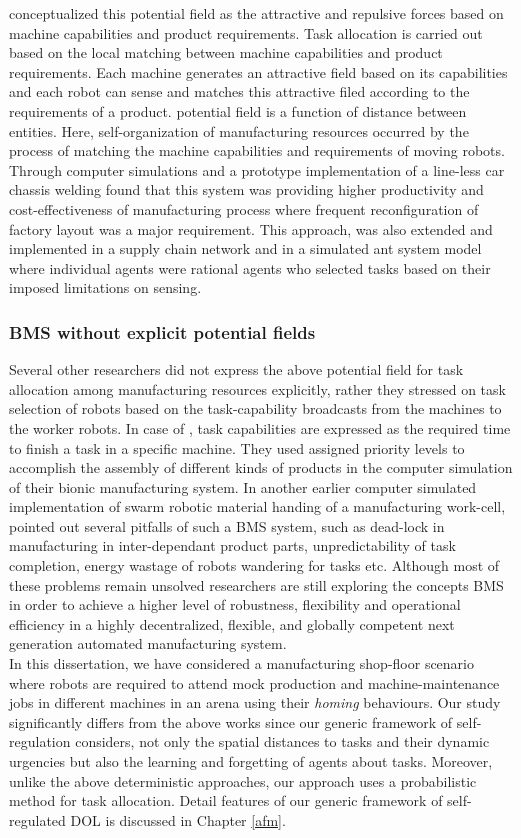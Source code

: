  conceptualized this potential field as the attractive and repulsive forces based on machine capabilities and product requirements. Task allocation is carried out based on the local matching between machine capabilities and product requirements. Each machine generates an attractive field based on its capabilities and each robot can sense and matches this attractive filed according to the requirements of a product. potential field is a function of distance between entities. Here, self-organization of manufacturing resources occurred by the process of matching the machine capabilities and requirements of moving robots. Through computer simulations and a prototype implementation of a line-less car chassis welding \cite{Ueda2006} found that this system was providing higher productivity and cost-effectiveness of manufacturing process where frequent reconfiguration of factory layout was a major requirement. This approach, was also extended and implemented in a supply chain network and in a simulated ant system model where individual agents were rational agents who selected tasks based on their imposed limitations on sensing.
\subsubsection*{BMS without explicit potential fields}
Several other researchers did not express the above potential field for task allocation among manufacturing resources explicitly, rather they stressed on task selection of robots based on the task-capability broadcasts from the machines to the worker robots. In case of \cite{Lazinica+2007}, task capabilities are expressed as the required time to finish a task in a specific machine. They used assigned priority levels to accomplish the assembly of different kinds of products in the computer simulation of their bionic manufacturing system. In another earlier computer simulated implementation of swarm robotic material handing of a manufacturing work-cell, \cite{Doty+1993} pointed out several pitfalls of such a BMS system, such as dead-lock in manufacturing in inter-dependant product parts, unpredictability of task completion, energy wastage of robots wandering for tasks etc. Although most of these problems remain unsolved researchers are still exploring the concepts BMS in order to achieve a higher level of robustness, flexibility and operational efficiency in a highly decentralized, flexible, and globally competent next generation automated manufacturing system.\\
In this dissertation, we have considered a manufacturing shop-floor scenario where robots are required to attend mock production and machine-maintenance jobs in different machines in an arena using their {\em homing} behaviours. Our study significantly differs from the above works since our generic framework of self-regulation considers, not only the spatial distances to tasks and their dynamic urgencies but also the learning and forgetting of agents about tasks. Moreover, unlike the above deterministic approaches, our approach uses a probabilistic method for task allocation. Detail features of our generic framework of self-regulated DOL is discussed in Chapter \ref{afm}. 